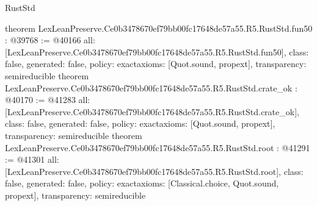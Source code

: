 \begin{lexlean}{RustStd}
\begin{coremodule}
{}
theorem LexLeanPreserve.Ce0b3478670ef79bb00fc17648de57a55.R5.RustStd.fun50 : @39768 := @40166 {
  all: [LexLeanPreserve.Ce0b3478670ef79bb00fc17648de57a55.R5.RustStd.fun50],
  class: false,
  generated: false,
  policy: exact{axioms: [Quot.sound, propext]},
  transparency: semireducible
}
theorem LexLeanPreserve.Ce0b3478670ef79bb00fc17648de57a55.R5.RustStd.crate_ok : @40170 := @41283 {
  all: [LexLeanPreserve.Ce0b3478670ef79bb00fc17648de57a55.R5.RustStd.crate_ok],
  class: false,
  generated: false,
  policy: exact{axioms: [Quot.sound, propext]},
  transparency: semireducible
}
theorem LexLeanPreserve.Ce0b3478670ef79bb00fc17648de57a55.R5.RustStd.root : @41291 := @41301 {
  all: [LexLeanPreserve.Ce0b3478670ef79bb00fc17648de57a55.R5.RustStd.root],
  class: false,
  generated: false,
  policy: exact{axioms: [Classical.choice, Quot.sound, propext]},
  transparency: semireducible
}


\end{coremodule}
\end{lexlean}
